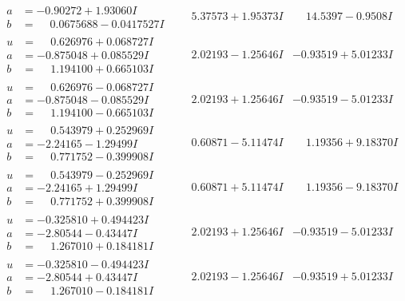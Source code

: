 \documentclass[1p]{elsarticle_modified}
\theoremstyle{definition}
\begin{document}
$$\begin{array}{c|c|c}
\begin{aligned}
a &= -0.90272 + 1.93060 I \\
b &= \phantom{-}0.0675688 - 0.0417527 I\end{aligned}
 & \phantom{-}5.37573 + 1.95373 I & \phantom{-}14.5397 - 0.9508 I \\ \hline\begin{aligned}
u &= \phantom{-}0.626976 + 0.068727 I \\
a &= -0.875048 + 0.085529 I \\
b &= \phantom{-}1.194100 + 0.665103 I\end{aligned}
 & \phantom{-}2.02193 - 1.25646 I & -0.93519 + 5.01233 I \\ \hline\begin{aligned}
u &= \phantom{-}0.626976 - 0.068727 I \\
a &= -0.875048 - 0.085529 I \\
b &= \phantom{-}1.194100 - 0.665103 I\end{aligned}
 & \phantom{-}2.02193 + 1.25646 I & -0.93519 - 5.01233 I \\ \hline\begin{aligned}
u &= \phantom{-}0.543979 + 0.252969 I \\
a &= -2.24165 - 1.29499 I \\
b &= \phantom{-}0.771752 - 0.399908 I\end{aligned}
 & \phantom{-}0.60871 - 5.11474 I & \phantom{-}1.19356 + 9.18370 I \\ \hline\begin{aligned}
u &= \phantom{-}0.543979 - 0.252969 I \\
a &= -2.24165 + 1.29499 I \\
b &= \phantom{-}0.771752 + 0.399908 I\end{aligned}
 & \phantom{-}0.60871 + 5.11474 I & \phantom{-}1.19356 - 9.18370 I \\ \hline\begin{aligned}
u &= -0.325810 + 0.494423 I \\
a &= -2.80544 - 0.43447 I \\
b &= \phantom{-}1.267010 + 0.184181 I\end{aligned}
 & \phantom{-}2.02193 + 1.25646 I & -0.93519 - 5.01233 I \\ \hline\begin{aligned}
u &= -0.325810 - 0.494423 I \\
a &= -2.80544 + 0.43447 I \\
b &= \phantom{-}1.267010 - 0.184181 I\end{aligned}
 & \phantom{-}2.02193 - 1.25646 I & -0.93519 + 5.01233 I \\ \hline\begin{aligned}

\end{aligned}
\end{array}$$
\end{document}
